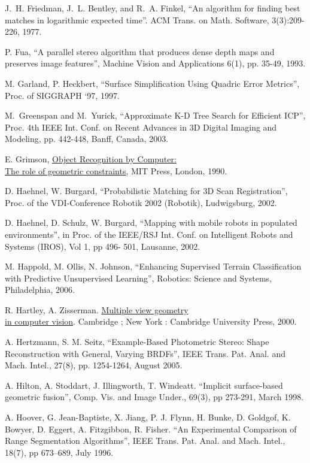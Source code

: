 \documentclass[twocolumn,oneside]{book}
\begin{document}
\begin{thebibliography}{99}
J.~H. Friedman, J.~L. Bentley, and R.~A. Finkel,
``An algorithm for finding best matches in logarithmic expected time''.
ACM Trans. on Math. Software, 3(3):209-226, 1977.

P. Fua,
``A parallel stereo algorithm that produces dense depth maps and preserves image features'',
Machine Vision and Applications 6(1), pp. 35-49, 1993.

M. Garland, P. Heckbert,
``Surface Simplification Using Quadric Error Metrics'',
Proc. of SIGGRAPH ‘97, 1997.

M.~Greenspan and M.~Yurick,
``Approximate K-D Tree Search for Efficient ICP'',
Proc. 4th IEEE Int. Conf. on Recent Advances in 3D Digital Imaging and Modeling,
pp. 442-448, Banff, Canada, 2003.

E. Grimson,
{\underline {Object Recognition by Computer:}}\\{\underline {The role of geometric constraints}},
MIT Press, London, 1990.

D. Haehnel, W. Burgard,
``Probabilistic Matching for 3D Scan Registration'',
Proc. of the VDI-Conference Robotik 2002 (Robotik), Ludwigsburg, 2002.

D. Haehnel, D. Schulz, W. Burgard,
``Mapping with mobile robots in populated environments'',
in Proc. of the IEEE/RSJ Int. Conf. on Intelligent
Robots and Systems (IROS), Vol 1, pp 496- 501, Lausanne, 2002.

M. Happold, M. Ollis, N. Johnson,
``Enhancing Supervised Terrain Classification with Predictive Unsupervised Learning'',
Robotics: Science and Systems, Philadelphia, 2006.

R. Hartley, A. Zisserman.
{\underline{Multiple view geometry}}\\{\underline{in computer vision}}.
Cambridge ; New York : Cambridge University Press, 2000.

A. Hertzmann, S. M. Seitz, 
``Example-Based Photometric Stereo: Shape Reconstruction with General, Varying BRDFs'',
IEEE Trans. Pat. Anal. and Mach. Intel., 27(8), pp. 1254-1264, August 2005.

A. Hilton, A. Stoddart, J. Illingworth, T. Windeatt.
``Implicit surface-based geometric fusion'',
Comp. Vis. and Image Under., 69(3), pp 273-291, March 1998.

A. Hoover, G. Jean-Baptiste, X. Jiang, P. J. Flynn,
H. Bunke, D. Goldgof, K. Bowyer,
D. Eggert, A. Fitzgibbon, R. Fisher.
``An Experimental Comparison of Range Segmentation Algorithms'',
IEEE Trans. Pat. Anal. and Mach. Intel., 18(7), pp 673--689, July 1996.


\end{thebibliography}
\end{document}
